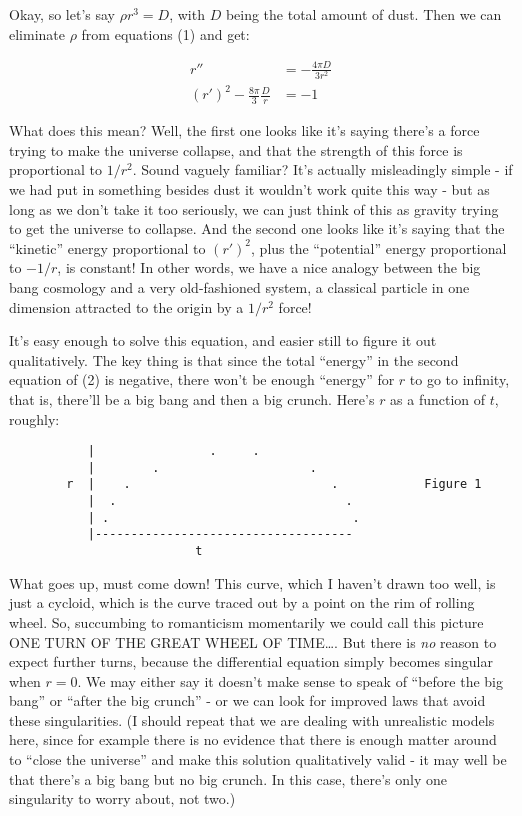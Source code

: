 \documentclass{article}
\begin{document}
Okay, so let's say \(\rho r^3 = D\), with \(D\) being the total amount
of dust. Then we can eliminate \(\rho\) from equations (1) and get:

\[\begin{aligned}r'' &= -\frac{4\pi D}{3r^2} \\ (r')^2-\frac{8\pi}{3}\frac{D}{r} &= -1 \end{aligned}\tag{2}\]

What does this mean? Well, the first one looks like it's saying there's
a force trying to make the universe collapse, and that the strength of
this force is proportional to \(1/r^2\). Sound vaguely familiar? It's
actually misleadingly simple - if we had put in something besides dust
it wouldn't work quite this way - but as long as we don't take it too
seriously, we can just think of this as gravity trying to get the
universe to collapse. And the second one looks like it's saying that the
``kinetic'' energy proportional to \((r')^2\), plus the ``potential''
energy proportional to \(-1/r\), is constant! In other words, we have a
nice analogy between the big bang cosmology and a very old-fashioned
system, a classical particle in one dimension attracted to the origin by
a \(1/r^2\) force!

It's easy enough to solve this equation, and easier still to figure it
out qualitatively. The key thing is that since the total ``energy'' in
the second equation of (2) is negative, there won't be enough ``energy''
for \(r\) to go to infinity, that is, there'll be a big bang and then a
big crunch. Here's \(r\) as a function of \(t\), roughly:

\begin{verbatim}
           |                .     .
           |        .                     .
        r  |    .                            .            Figure 1
           |  .                                .
           | .                                  .
           |------------------------------------
                          t
\end{verbatim}

What goes up, must come down! This curve, which I haven't drawn too
well, is just a cycloid, which is the curve traced out by a point on the
rim of rolling wheel. So, succumbing to romanticism momentarily we could
call this picture ONE TURN OF THE GREAT WHEEL OF TIME\ldots. But there
is \emph{no} reason to expect further turns, because the differential
equation simply becomes singular when \(r = 0\). We may either say it
doesn't make sense to speak of ``before the big bang'' or ``after the
big crunch'' - or we can look for improved laws that avoid these
singularities. (I should repeat that we are dealing with unrealistic
models here, since for example there is no evidence that there is enough
matter around to ``close the universe'' and make this solution
qualitatively valid - it may well be that there's a big bang but no big
crunch. In this case, there's only one singularity to worry about, not
two.)
\end{document}
